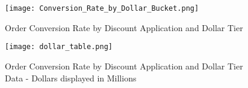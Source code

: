 \documentclass[12pt,english]{article}
\begin{document}
\begin{figure}[htb]
        \centering
        \texttt{[image: Conversion\_Rate\_by\_Dollar\_Bucket.png]}
        \caption{Order Conversion Rate by Discount Application and Dollar Tier}
    \label{fig:fig1}
\end{figure}
\begin{figure}
    \centering
    \texttt{[image: dollar\_table.png]}
    \caption{Order Conversion Rate by Discount Application and Dollar Tier Data - Dollars displayed in Millions}
    \label{fig:enter-label}
\end{figure}
\end{document}
